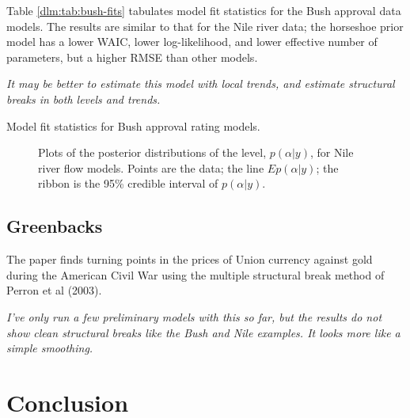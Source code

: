 Table \ref{dlm:tab:bush-fits} tabulates model fit statistics for the Bush approval data models. 
The results are similar to that for the Nile river data; the horseshoe prior model has a lower WAIC, lower log-likelihood, and lower effective number of parameters, but a higher RMSE than other models.


\textit{It may be better to estimate this model with local trends, and estimate structural breaks in both levels and trends.}

\begin{table}[htpb]
  \centering
  \caption{Model fit statistics for Bush approval rating models.}
  \label{dlm:tab:bush-fits}
\end{table}

\begin{figure}[htpb]
  \centering
  \begin{subfigure}{1.0\textwidth}
    \caption{}
    \label{dlm:fig:bush1}
  \end{subfigure}
  \begin{subfigure}{1.0\textwidth}
    \caption{}
    \label{dlm:fig:bush2}
  \end{subfigure}
  \caption{Plots of the posterior distributions of the level, $p(\alpha | y)$, for Nile river flow models. Points are the data; the line $E p(\alpha | y)$; the ribbon is the 95\% credible interval of $p(\alpha | y)$.}
  \label{dlm:fig:bush-posterior}
\end{figure}


\subsection{Greenbacks}
\label{dlm:sec:greenbacks}

The paper \textcite{WillardGuinnaneEtAl1996} finds turning points in the prices of Union currency against gold during the American Civil War using the multiple structural break method of Perron et al (2003).

\textit{I've only run a few preliminary models with this so far, but the results do not show clean structural breaks like the Bush and Nile examples. It looks more like a simple smoothing.}


\section{Conclusion}
\label{dlm:sec:conclusion}

